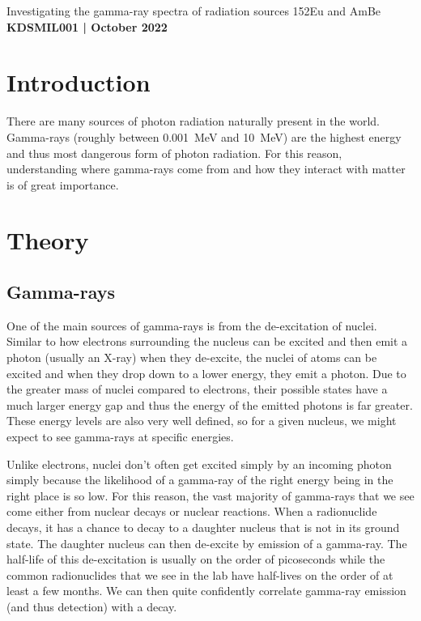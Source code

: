 \documentclass[11pt]{article}
\numberwithin{equation}{section}
\numberwithin{figure}{section}
\numberwithin{table}{section}
\begin{document}
\begin{center}
    {\huge Investigating the gamma-ray spectra of radiation sources 152Eu and AmBe}\\
    \vspace{0.2in}
    \textbf{KDSMIL001 | October 2022}
\end{center}


\section{Introduction}\label{sec:Introduction}
There are many sources of photon radiation naturally present in the world. Gamma-rays (roughly between \SI{0.001}{\mega\electronvolt} and \SI{10}{\mega\electronvolt}) are the highest energy and thus most dangerous form of photon radiation. For this reason, understanding where gamma-rays come from and how they interact with matter is of great importance. 

\section{Theory}\label{sec:Theory}

\subsection{Gamma-rays}\label{sec:GammaTheory}
One of the main sources of gamma-rays is from the de-excitation of nuclei. Similar to how electrons surrounding the nucleus can be excited and then emit a photon (usually an X-ray) when they de-excite, the nuclei of atoms can be excited and when they drop down to a lower energy, they emit a photon. Due to the greater mass of nuclei compared to electrons, their possible states have a much larger energy gap and thus the energy of the emitted photons is far greater. These energy levels are also very well defined, so for a given nucleus, we might expect to see gamma-rays at specific energies. 

Unlike electrons, nuclei don't often get excited simply by an incoming photon simply because the likelihood of a gamma-ray of the right energy being in the right place is so low. For this reason, the vast majority of gamma-rays that we see come either from nuclear decays or nuclear reactions. When a radionuclide decays, it has a chance to decay to a daughter nucleus that is not in its ground state. The daughter nucleus can then de-excite by emission of a gamma-ray. The half-life of this de-excitation is usually on the order of picoseconds while the common radionuclides that we see in the lab have half-lives on the order of at least a few months. We can then quite confidently correlate gamma-ray emission (and thus detection) with a decay. 
\end{document}
